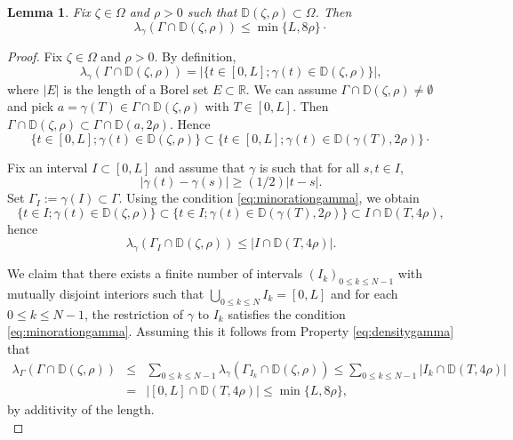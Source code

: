 \documentclass[a4paper,11pt,leqno,english]{smfart}
\theoremstyle{plain}
\theoremstyle{plain}
\numberwithin{equation}{section} %
\numberwithin{figure}{section} %
\theoremstyle{plain}
\theoremstyle{plain}
\newtheorem{lem}[thm]{Lemma} %
\theoremstyle{remark}
\theoremstyle{remark}
\theoremstyle{definition}
\theoremstyle{plain}
\theoremstyle{plain}
\theoremstyle{definition}
\newcommand{\R}{{\mathbb{R}}}
\begin{document}
 
 
    
    \begin{lem} \label{lem:density} 
Fix $\zeta \in \Omega$ and $\rho >0$ such that ${\mathbb D }(\zeta,\rho) \subset \Omega$. Then  
  $$
  \lambda_\gamma (\Gamma \cap {\mathbb D }(\zeta,\rho)) \leq \min\{L,8 \rho\}\cdot
  $$
    \end{lem}
    
    \begin{proof}  
  Fix $\zeta \in \Omega$ and  $\rho >0$.  By definition,  
   $$
   \lambda_\gamma (\Gamma \cap {\mathbb D }(\zeta,\rho)) = \vert \{t \in [0,L] ; \gamma (t) \in {\mathbb D }(\zeta,\rho)\}\vert,
   $$
    where $\vert E \vert$ is the length  of a Borel set $E \subset \R$.
        We can assume   $\Gamma \cap {\mathbb D }(\zeta,\rho) \neq \emptyset$ and pick 
         $a  = \gamma (T) \in \Gamma \cap {\mathbb D }(\zeta,\rho)$ with $T \in [0,L]$.  Then $\Gamma \cap {\mathbb D }(\zeta,\rho) \subset \Gamma \cap {\mathbb D }(a,2\rho)$. Hence
  $$
  \{t \in [0,L] ; \gamma (t) \in {\mathbb D }(\zeta,\rho)\} \subset \{t \in [0,L] ; \gamma (t) \in {\mathbb D }(\gamma(T),2\rho)\}\cdot
  $$ 
  
    Fix an interval $I \subset [0,L]$ and assume that $\gamma$ is such that for all $s, t \in I$,
  \begin{equation} \label{eq:minorationgamma}
  \vert\gamma (t) - \gamma (s) \vert \geq (1\slash 2) \vert t - s\vert.
  \end{equation}  
 Set $\Gamma_I := \gamma(I) \subset \Gamma$.
Using the condition \eqref{eq:minorationgamma}, we obtain
  $$
  \{t \in I ; \gamma (t) \in {\mathbb D }(\zeta,\rho)\} \subset \{t \in I ; \gamma (t) \in {\mathbb D }(\gamma(T),2\rho)\} \subset I \cap {\mathbb D }(T,4\rho),
  $$ 
hence
   \begin{equation} \label{eq:densitygamma}
 \lambda_\gamma (\Gamma_I \cap {\mathbb D }(\zeta,\rho)) \leq  \vert I \cap {\mathbb D }(T,4\rho)\vert.
   \end{equation}
 
  We claim that there exists a finite number of intervals $(I_k)_{0 \leq k \leq N-1}$ with  mutually disjoint interiors such that  $\bigcup_{0 \leq k \leq N} I_k = [0,L]$ and for each $0 \leq k \leq N-1$, the restriction of $\gamma$ to  $I_k$ satisfies the condition \eqref{eq:minorationgamma}.
  Assuming this it follows from Property \eqref{eq:densitygamma} that 
  \begin{eqnarray*}
  \lambda_\Gamma (\Gamma \cap {\mathbb D }(\zeta,\rho)) 
  &\leq & \sum_{0\leq k \leq N-1} \lambda_\gamma (\Gamma_{I_k} \cap {\mathbb D }(\zeta,\rho)) 
   \leq  \sum_{0\leq k \leq N-1}  \vert I_k \cap {\mathbb D }(T,4\rho)\vert \\
  &=& \vert [0,L] \cap {\mathbb D }(T,4\rho)\vert \leq \min\{L, 8 \rho\},
  \end{eqnarray*}
   by additivity of the length.   \\
    

\end{proof}
\end{document}
